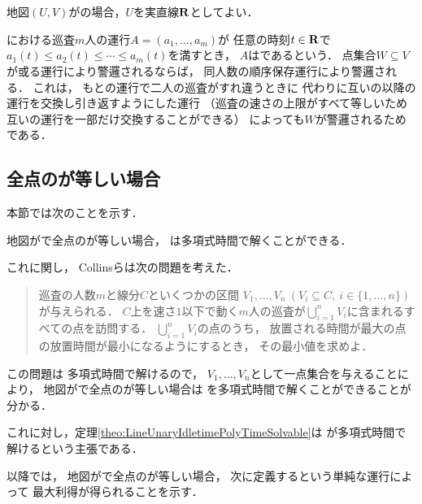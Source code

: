 \chapter{{\graphLine}}
\label{chapter: line}

地図$(U, V)$が{\graphLine}の場合，$U$を実直線$\mathbf R$としてよい．

{\graphLine}における巡査$m$人の運行$A = (a_1, \ldots, a_m)$が
任意の時刻$t \in \mathbf R$で
$a_1(t) \leq a_2(t) \leq \cdots \leq a_m(t)$を満すとき，
$A$はであるという．
点集合$W \subseteq V$が或る運行により警邏されるならば，
同人数の順序保存運行により警邏される．
これは，
もとの運行で二人の巡査がすれ違うときに
代わりに互いの以降の運行を交換し引き返すようにした運行
（巡査の速さの上限がすべて等しいため
互いの運行を一部だけ交換することができる）
によっても$W$が警邏されるためである．


\section{全点の{\maxIdletime}が等しい場合}
\label{section:LineUnaryIdletime}


本節では次のことを示す．

\begin{theo}
  \label{theo:LineUnaryIdletimePolyTimeSolvable}
  地図が{\graphLine}で全点の{\maxIdletime}が等しい場合，
  {\PPProfit}は多項式時間で解くことができる．
\end{theo}

これに関し，
Collinsら\cite{collins2013optimal}は次の問題を考えた．
\begin{quote}
  巡査の人数$m$と線分$C$といくつかの区間
  $V_1, \ldots, V_n\ (V_i \subseteq C,\ i \in \{1,\ldots, n\})$%
  が与えられる．
  $C$上を速さ$1$以下で動く$m$人の巡査が$\bigcup_{i = 1}^n V_i$に含まれるすべての点を訪問する．
  $\bigcup_{i = 1}^n V_i$の点のうち，
  放置される時間が最大の点の放置時間が最小になるようにするとき，
  その最小値を求めよ．
\end{quote}
この問題は
多項式時間で解ける\cite[Theorem~2.1]{collins2013optimal}ので，
$V_1, \ldots, V_n$として一点集合を与えることにより，
地図が{\graphLine}で全点の{\maxIdletime}が等しい場合は
{\PP}を多項式時間で解くことができることが分かる．

これに対し，定理\ref{theo:LineUnaryIdletimePolyTimeSolvable}は
{\PPProfit}が多項式時間で解けるという主張である．

\newcommand{\sepSectPatroll}{独立往復運行}

以降では，
地図が{\graphLine}で全点の{\maxIdletime}が等しい場合，
次に定義する\defword{\sepSectPatroll}という単純な運行によって
最大利得が得られることを示す．

